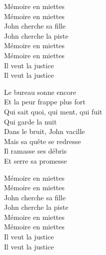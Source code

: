 \begin{lyrics}
Mémoire en miettes\\
Mémoire en miettes\\
John cherche sa fille\\
John cherche la piste\\
Mémoire en miettes\\
Mémoire en miettes\\
Il veut la justice\\
Il veut la justice

Le bureau sonne encore\\
Et la peur frappe plus fort\\
Qui sait quoi, qui ment, qui fuit\\
Qui garde la nuit\\
Dans le bruit, John vacille\\
Mais sa quête se redresse\\
Il ramasse ses débris\\
Et serre sa promesse

Mémoire en miettes\\
Mémoire en miettes\\
John cherche sa fille\\
John cherche la piste\\
Mémoire en miettes\\
Mémoire en miettes\\
Il veut la justice\\
Il veut la justice
\end{lyrics}

